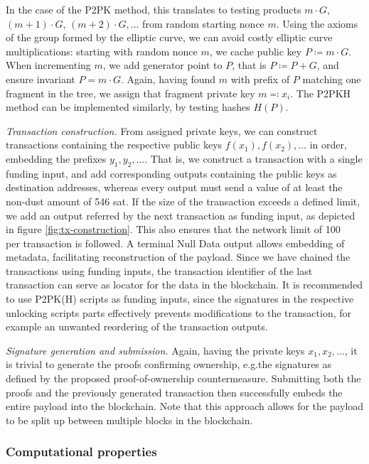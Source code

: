 \documentclass[a4paper,11pt,titlepage]{scrbook}
\begin{document}
In the case of the P2PK method, this translates to testing products $m\cdot G$, $(m{+}1)\cdot G$, $(m{+}2)\cdot G,\dots$ from random starting nonce $m$.
Using the axioms of the group formed by the elliptic curve, we can avoid costly elliptic curve multiplications: starting with random nonce $m$, we cache public key $P\coloneqq m\cdot G$.
When incrementing $m$, we add generator point to $P$, that is $P\coloneqq P+G$, and ensure invariant $P= m\cdot G$.
Again, having found $m$ with prefix of $P$ matching one fragment in the tree, we assign that fragment private key $m\eqqcolon x_i$.
The P2PKH method can be implemented similarly, by testing hashes $H(P)$.

\emph{Transaction construction.}
From assigned private keys, we can construct transactions containing the respective public keys $f(x_1), f(x_2), \dots$ in order, embedding the prefixes $y_1, y_2, \dots$.
That is, we construct a transaction with a single funding input, and add corresponding outputs containing the public keys as destination addresses, whereas every output must send a value of at least the non-dust amount of 546 sat.
If the size of the transaction exceeds a defined limit, we add an output referred by the next transaction as funding input, as depicted in figure \ref{fig:tx-construction}.
This also ensures that the network limit of \SI{100}{\kilo\byte} per transaction is followed.
A terminal Null Data output allows embedding of metadata, facilitating reconstruction of the payload.
Since we have chained the transactions using funding inputs, the transaction identifier of the last transaction can serve as locator for the data in the blockchain.
It is recommended to use P2PK(H) scripts as funding inputs, since the signatures in the respective unlocking scripts parts effectively prevents modifications to the transaction, for example an unwanted reordering of the transaction outputs.

\emph{Signature generation and submission.}
Again, having the private keys $x_1, x_2, \dots$, it is trivial to generate the proofs confirming ownership, e.g.\@ the signatures as defined by the proposed proof-of-ownership countermeasure.
Submitting both the proofs and the previously generated transaction then successfully embeds the entire payload into the blockchain.
Note that this approach allows for the payload to be split up between multiple blocks in the blockchain.

\subsubsection*{Computational properties}
\end{document}
